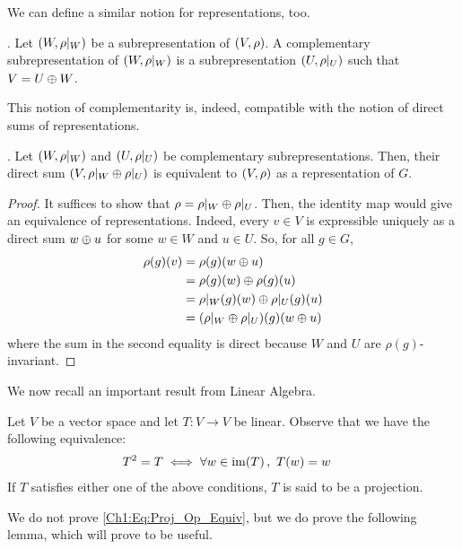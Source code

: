 We can define a similar notion for representations, too.
\begin{boxdefinition}
    . Let $\left( W, \rho\vert_W \right)$ be a subrepresentation of $\left( V, \rho \right)$. A complementary subrepresentation of $\left( W, \rho\vert_W \right)$ is a subrepresentation $\left( U, \rho\vert_U \right)$ such that $V = U \oplus W$.
\end{boxdefinition}
This notion of complementarity is, indeed, compatible with the notion of direct sums of representations.
\begin{proposition}
    . Let $\left( W, \rho\vert_W \right)$ and $\left( U, \rho\vert_U \right)$ be complementary subrepresentations. Then, their direct sum $\left( V, \rho\vert_W \oplus \rho\vert_U \right)$ is equivalent to $\left( V, \rho \right)$ as a representation of $G$.
\end{proposition}
\begin{proof}
    It suffices to show that $\rho = \rho\vert_W \oplus \rho\vert_U$. Then, the identity map would give an equivalence of representations. Indeed, every $v \in V$ is expressible uniquely as a direct sum $w \oplus u$ for some $w \in W$ and $u \in U$. So, for all $g \in G$,
    \begin{align*}
        \rho(g)(v) &= \rho(g)(w \oplus u) \\
        &= \rho(g)(w) \oplus \rho(g)(u) \\
        &= \rho\vert_W(g)(w) \oplus \rho\vert_U(g)(u) \\
        &= \left( \rho\vert_W \oplus \rho\vert_U \right)\!(g)(w \oplus u)
    \end{align*}
    where the sum in the second equality is direct because $W$ and $U$ are $\rho(g)$-invariant.
\end{proof}

We now recall an important result from Linear Algebra.

\begin{definition}[Projection]
    Let $V$ be a vector space and let $T : V \to V$ be linear. Observe that we have the following equivalence:
    \begin{align}
        T^2 = T &\iff \forall w \in \operatorname{im}\!\left( T \right),\ T(w) = w \label{Ch1:Eq:Proj_Op_Equiv}
    \end{align}
    If $T$ satisfies either one of the above conditions, $T$ is said to be a projection.
\end{definition}

We do not prove \eqref{Ch1:Eq:Proj_Op_Equiv}, but we do prove the following lemma, which will prove to be useful.

